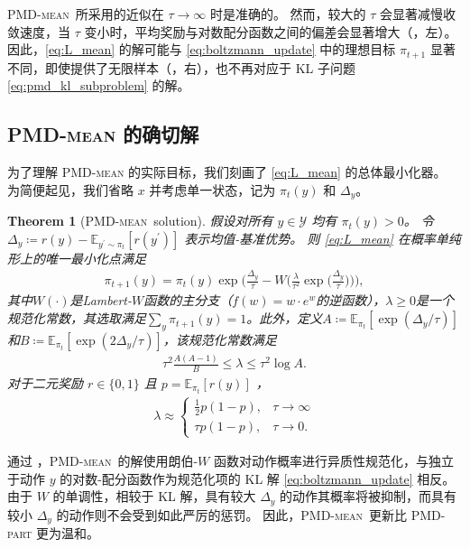 \documentclass{article}
\theoremstyle{plain}
\newtheorem{theorem}{Theorem}[section]
\theoremstyle{definition}
\theoremstyle{remark}
\newcommand{\pmdmean}{\textsc{PMD-mean}}
\newcommand{\E}{\mathbb{E}}
\newcommand{\cW}{W}
\begin{document}
\textsc{PMD-mean}\ 所采用的近似在 $\tau\to\infty$ 时是准确的。  
然而，较大的 $\tau$ 会显著减慢收敛速度，当 $\tau$ 变小时，平均奖励与对数配分函数之间的偏差会显著增大（，左）。  
因此，\eqref{eq:L_mean} 的解可能与 \eqref{eq:boltzmann_update} 中的理想目标 $\pi_{t+1}$ 显著不同，即使提供了无限样本（，右），也不再对应于 KL 子问题 \eqref{eq:pmd_kl_subproblem} 的解。 


\subsection{\textsc{PMD-mean} 的确切解}
\label{sec:closed_form}
为了理解 \textsc{PMD-mean} 的实际目标，我们刻画了 \eqref{eq:L_mean} 的总体最小化器。  
为简便起见，我们省略 $x$ 并考虑单一状态，记为 $\pi_t(y)$ 和 $\Delta_y$。
\begin{theorem}[\pmdmean\ solution]
    \label{thm:pmdmean_solution}
    假设对所有 $y\in\mathcal{Y}$ 均有 $\pi_t(y)>0$。  
令 $\Delta_y \coloneqq r(y) - \E_{y^\prime\sim \pi_t}[r(y^\prime)]$ 表示均值-基准优势。  
则 \eqref{eq:L_mean} 在概率单纯形上的唯一最小化点满足
    \begin{align}
        \pi_{t+1}(y)
        =\pi_t(y)\exp\Big(\frac{\Delta_y}{\tau}-\cW\Big(\frac{\lambda}{\tau^2}\exp\Big(\frac{\Delta_y}{\tau}\Big)\Big)\Big),
        \label{eq:pmdmean_lambertW_form}
    \end{align}
    其中$\cW(\cdot)$是Lambert-$W$函数的主分支（$f(w)=w\cdot e^w$的逆函数），$\lambda\ge 0$是一个规范化常数，其选取满足$\sum_y \pi_{t+1}(y)=1$。此外，定义$A\coloneqq \E_{\pi_t}[\exp(\Delta_y/\tau)]$和$B\coloneqq \E_{\pi_t}[\exp(2\Delta_y/\tau)]$，该规范化常数满足
    \begin{align}
        \tau^2\frac{A(A-1)}{B}\leq\lambda\leq\tau^2\log A.
        \label{eq:lambda_bounds}
    \end{align}
    对于二元奖励 $r\in\{0,1\}$ 且 $p=\E_{\pi_t}[r(y)]$ ，
    \begin{align}
        \lambda\approx\begin{cases}
            \frac{1}{2}p(1-p), & \tau\to\infty\\
            \tau p(1-p), &\tau\to 0.
        \end{cases}
        \label{eq:lambda_asymptotics}
    \end{align}
\end{theorem}
通过 ，\textsc{PMD-mean}\ 的解使用朗伯-$W$ 函数对动作概率进行异质性规范化，与独立于动作 $y$ 的对数-配分函数作为规范化项的 KL 解 \eqref{eq:boltzmann_update} 相反。  
由于 $W$ 的单调性，相较于 KL 解，具有较大 $\Delta_y$  的动作其概率将被抑制，而具有较小 $\Delta_y$  的动作则不会受到如此严厉的惩罚。  
因此，\textsc{PMD-mean}\ 更新比 \textsc{PMD-part} 更为温和。 
\end{document}

